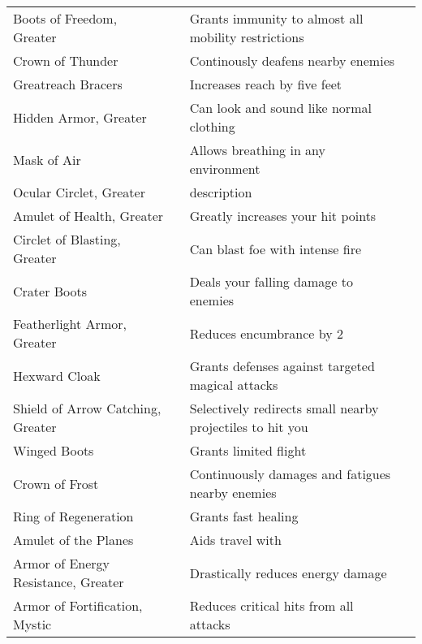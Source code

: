 \begin{longtabuwrapper}
\begin{longtabu}{l l X l}
Boots of Freedom, Greater &  & Grants immunity to almost all mobility restrictions & \pageref{item:Boots of Freedom, Greater} \\
Crown of Thunder &  & Continously deafens nearby enemies & \pageref{item:Crown of Thunder} \\
Greatreach Bracers &  & Increases reach by five feet & \pageref{item:Greatreach Bracers} \\
Hidden Armor, Greater &  & Can look and sound like normal clothing & \pageref{item:Hidden Armor, Greater} \\
Mask of Air &  & Allows breathing in any environment & \pageref{item:Mask of Air} \\
Ocular Circlet, Greater &  & description & \pageref{item:Ocular Circlet, Greater} \\
Amulet of Health, Greater &  & Greatly increases your hit points & \pageref{item:Amulet of Health, Greater} \\
Circlet of Blasting, Greater &  & Can blast foe with intense fire & \pageref{item:Circlet of Blasting, Greater} \\
Crater Boots &  & Deals your falling damage to enemies & \pageref{item:Crater Boots} \\
Featherlight Armor, Greater &  & Reduces encumbrance by 2 & \pageref{item:Featherlight Armor, Greater} \\
Hexward Cloak &  & Grants  defenses against targeted magical attacks & \pageref{item:Hexward Cloak} \\
Shield of Arrow Catching, Greater &  & Selectively redirects small nearby projectiles to hit you & \pageref{item:Shield of Arrow Catching, Greater} \\
Winged Boots &  & Grants limited flight & \pageref{item:Winged Boots} \\
Crown of Frost &  & Continuously damages and fatigues nearby enemies & \pageref{item:Crown of Frost} \\
Ring of Regeneration &  & Grants fast healing & \pageref{item:Ring of Regeneration} \\
Amulet of the Planes &  & Aids travel with  & \pageref{item:Amulet of the Planes} \\
Armor of Energy Resistance, Greater &  & Drastically reduces energy damage & \pageref{item:Armor of Energy Resistance, Greater} \\
Armor of Fortification, Mystic &  & Reduces critical hits from all attacks & \pageref{item:Armor of Fortification, Mystic} \\

\end{longtabu}
\end{longtabuwrapper}
